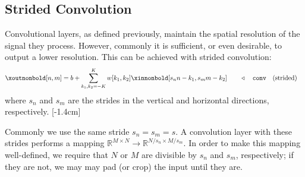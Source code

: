 \subsection{Strided Convolution}

Convolutional layers, as defined previously, maintain the spatial resolution of the signal they process. However, commonly it is sufficient, or even desirable, to output a lower resolution. This can be achieved with strided convolution:
\begin{align}
\xoutnonbold[n,m] =
b + \sum_{k_1,k_2=-K}^K w[k_1,k_2] \xinnonbold[s_n n-k_1,s_m m-k_2] & \quad\quad \triangleleft \quad \texttt{conv}\quad \text{(strided)}\label{eqn:convolutional_neural_nets:convolutional_filter_strided}
\end{align}
where $s_n$ and $s_m$ are the strides in the vertical and horizontal directions, respectively. 
[-1.4cm]

Commonly we use the same stride $s_n = s_m = s$. A convolution layer with these strides performs a mapping $\mathbb{R}^{M \times N} \rightarrow \mathbb{R}^{N/s_n \times M/s_m}$. In order to make this mapping well-defined, we require that $N$ or $M$ are divisible by $s_n$ and $s_m$, respectively; if they are not, we may may pad (or crop) the input until they are.

